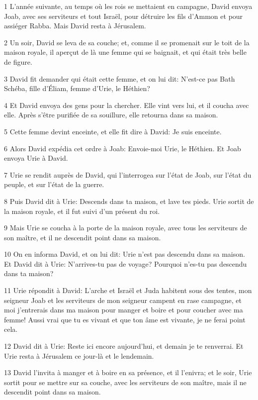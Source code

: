 \par 1 L'année suivante, au temps où les rois se mettaient en campagne, David envoya Joab, avec ses serviteurs et tout Israël, pour détruire les fils d'Ammon et pour assiéger Rabba. Mais David resta à Jérusalem.
\par 2 Un soir, David se leva de sa couche; et, comme il se promenait sur le toit de la maison royale, il aperçut de là une femme qui se baignait, et qui était très belle de figure.
\par 3 David fit demander qui était cette femme, et on lui dit: N'est-ce pas Bath Schéba, fille d'Éliam, femme d'Urie, le Héthien?
\par 4 Et David envoya des gens pour la chercher. Elle vint vers lui, et il coucha avec elle. Après s'être purifiée de sa souillure, elle retourna dans sa maison.
\par 5 Cette femme devint enceinte, et elle fit dire à David: Je suis enceinte.
\par 6 Alors David expédia cet ordre à Joab: Envoie-moi Urie, le Héthien. Et Joab envoya Urie à David.
\par 7 Urie se rendit auprès de David, qui l'interrogea sur l'état de Joab, sur l'état du peuple, et sur l'état de la guerre.
\par 8 Puis David dit à Urie: Descends dans ta maison, et lave tes pieds. Urie sortit de la maison royale, et il fut suivi d'un présent du roi.
\par 9 Mais Urie se coucha à la porte de la maison royale, avec tous les serviteurs de son maître, et il ne descendit point dans sa maison.
\par 10 On en informa David, et on lui dit: Urie n'est pas descendu dans sa maison. Et David dit à Urie: N'arrives-tu pas de voyage? Pourquoi n'es-tu pas descendu dans ta maison?
\par 11 Urie répondit à David: L'arche et Israël et Juda habitent sous des tentes, mon seigneur Joab et les serviteurs de mon seigneur campent en rase campagne, et moi j'entrerais dans ma maison pour manger et boire et pour coucher avec ma femme! Aussi vrai que tu es vivant et que ton âme est vivante, je ne ferai point cela.
\par 12 David dit à Urie: Reste ici encore aujourd'hui, et demain je te renverrai. Et Urie resta à Jérusalem ce jour-là et le lendemain.
\par 13 David l'invita à manger et à boire en sa présence, et il l'enivra; et le soir, Urie sortit pour se mettre sur sa couche, avec les serviteurs de son maître, mais il ne descendit point dans sa maison.

